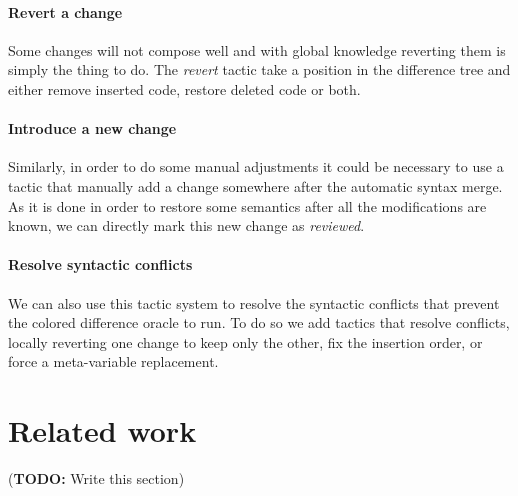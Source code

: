 \documentclass[a4paper,11pt]{article}
\newcommand\todo[1]{{\color{teal}(\textbf{TODO:} #1)}}
\begin{document}
\paragraph{Revert a change} Some changes will not compose well and with global knowledge reverting them is simply the thing to do. The \textit{revert} tactic take a position in the difference tree and either remove inserted code, restore deleted code or both.

\paragraph{Introduce a new change} Similarly, in order to do some manual adjustments it could be necessary to use a tactic that manually add a change somewhere after the automatic syntax merge. As it is done in order to restore some semantics after all the modifications are known, we can directly mark this new change as \textit{reviewed}.

\paragraph{Resolve syntactic conflicts} We can also use this tactic system to resolve the syntactic conflicts that prevent the colored difference oracle to run. To do so we add tactics that resolve conflicts, locally reverting one change to keep only the other, fix the insertion order, or force a meta-variable replacement.

\section{Related work}
\label{sec:related-work}
\todo{Write this section}
\end{document}
